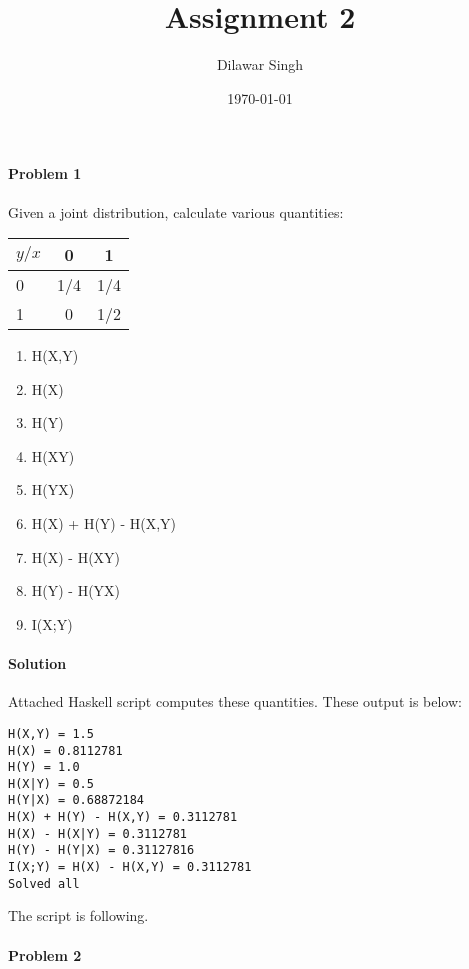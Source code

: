 \documentclass[]{article}
\title{Assignment 2}
\author{Dilawar Singh}
\date{\today}
\begin{document}
\maketitle

\paragraph{Problem 1}

Given a joint distribution, calculate various quantities:

\begin{tabular}[c]{l|c c}
\(y/x\) & 0 & 1 \\
\hline
0 & 1/4 & 1/4 \\
1 & 0 & 1/2 \\
\hline
\end{tabular}

\begin{enumerate}
\item H(X,Y)
\item H(X)
\item H(Y)
\item H(X\textbar{}Y)
\item H(Y\textbar{}X)
\item H(X) + H(Y) - H(X,Y)
\item H(X) - H(X\textbar{}Y)
\item H(Y) - H(Y\textbar{}X)
\item I(X;Y)
\end{enumerate}

\paragraph*{Solution}

Attached Haskell script computes these quantities. These output is below:

\begin{lstlisting}
H(X,Y) = 1.5 
H(X) = 0.8112781
H(Y) = 1.0
H(X|Y) = 0.5
H(Y|X) = 0.68872184
H(X) + H(Y) - H(X,Y) = 0.3112781
H(X) - H(X|Y) = 0.3112781
H(Y) - H(Y|X) = 0.31127816
I(X;Y) = H(X) - H(X,Y) = 0.3112781
Solved all
\end{lstlisting}

The script is following.


\paragraph{Problem 2}
\end{document}
